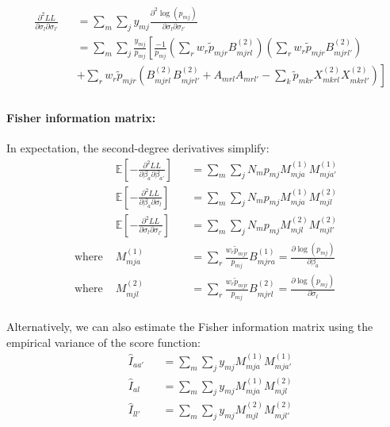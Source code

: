 \documentclass[12pt]{article}
\begin{document}
\begin{equation}
\begin{aligned}
	& \frac{\partial^2 LL}{\partial \sigma_l \partial \sigma_{l'}} && = \sum_m \sum_{j} y_{mj} \frac{\partial^2 \log(p_{mj})}{\partial \sigma_l \partial \sigma_{l'}} \\
	& && = \sum_m \sum_j \frac{y_{mj}}{p_{mj}} \left[ \frac{-1}{p_{mj}} \left( \sum_r w_r \tilde{p}_{mjr} B^{(2)}_{mjrl} \right) \left( \sum_r w_r \tilde{p}_{mjr} B^{(2)}_{mjrl'} \right) \right. \\
	& && \left. + \sum_r w_r \tilde{p}_{mjr} \left( B^{(2)}_{mjrl} B^{(2)}_{mjrl'} + A_{mrl} A_{mrl'} - \sum_k \tilde{p}_{mkr} X^{(2)}_{mkrl} X^{(2)}_{mkrl'} \right) \right] \\
\end{aligned}
\end{equation}


\paragraph{Fisher information matrix: \\}
In expectation, the second-degree derivatives simplify:
\begin{equation}
\begin{aligned}
	& \mathbb{E}\left[ - \frac{\partial^2 LL}{\partial \beta_a \partial \beta_{a'}} \right] && = \sum_m \sum_j N_m p_{mj} M^{(1)}_{mja} M^{(1)}_{mja'} \\
	& \mathbb{E}\left[ - \frac{\partial^2 LL}{\partial \beta_a \partial \sigma_{l}} \right] && = \sum_m \sum_j N_m p_{mj} M^{(1)}_{mja} M^{(2)}_{mjl} \\
	& \mathbb{E}\left[ - \frac{\partial^2 LL}{\partial \sigma_l \partial \sigma_{l'}} \right] && = \sum_m \sum_j N_m p_{mj} M^{(2)}_{mjl} M^{(2)}_{mjl'} \\
\text{where }  & M^{(1)}_{mja} && = \sum_r \frac{w_r \tilde{p}_{mjr}}{p_{mj}} B^{(1)}_{mjra} = \frac{\partial \log(p_{mj})}{\partial \beta_a}   \\
\text{where }  & M^{(2)}_{mjl} && = \sum_r \frac{w_r \tilde{p}_{mjr}}{p_{mj}} B^{(2)}_{mjrl} = \frac{\partial \log(p_{mj})}{\partial \sigma_l}   \\
\end{aligned}
\end{equation}

Alternatively, we can also estimate the Fisher information matrix using the empirical variance of the score function:
\begin{equation}
\begin{aligned}
	& \hat{I}_{aa'} && = \sum_m \sum_j y_{mj} M^{(1)}_{mja} M^{(1)}_{mja'} \\
	& \hat{I}_{al} && = \sum_m \sum_j y_{mj} M^{(1)}_{mja} M^{(2)}_{mjl} \\
	& \hat{I}_{ll'} && = \sum_m \sum_j y_{mj} M^{(2)}_{mjl} M^{(2)}_{mjl'} \\
\end{aligned}
\end{equation}
\end{document}
